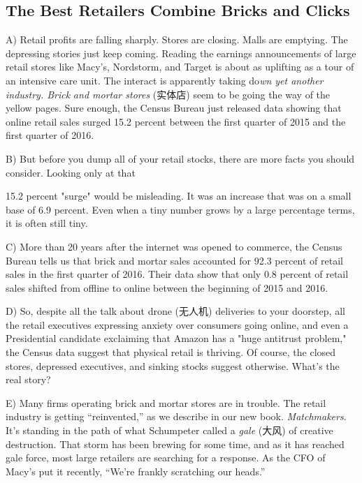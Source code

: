 \documentclass[UTF8,11pt]{ctexart}
\begin{document}
\subsection*{\textbf{The Best Retailers Combine Bricks and Clicks}}


A) Retail profits are falling sharply. Stores are closing. Malls are emptying. The depressing stories just keep coming. Reading the earnings announcements of large retail stores like Macy’s, Nordstorm, and Target is about as uplifting as a tour of an intensive care unit. The interact is apparently taking do\textit{wn yet another industry. Brick} \textit{and mortar stores} (实体店) seem to be going the way of the yellow pages. Sure enough, the Census Bureau just released data showing that online retail sales surged 15.2 percent between the first quarter of 2015 and the first quarter of 2016.


B) But before you dump all of your retail stocks, there are more facts you should consider. Looking only at that


15.2 percent "surge" would be misleading. It was an increase that was on a small base of 6.9 percent. Even when a tiny number grows by a large percentage terms, it is often still tiny.


C) More than 20 years after the internet was opened to commerce, the Census Bureau tells us that brick and mortar sales accounted for 92.3 percent of retail sales in the first quarter of 2016. Their data show that only 0.8 percent of retail sales shifted from offline to online between the beginning of 2015 and 2016.


D) So, despite all the talk about drone (无人机) deliveries to your doorstep, all the retail executives expressing anxiety over consumers going online, and even a Presidential candidate exclaiming that Amazon has a "huge antitrust problem," the Census data suggest that physical retail is thriving. Of course, the closed stores, depressed executives, and sinking stocks suggest otherwise. What's the real story?


E) Many firms operating brick and mortar stores are in trouble. The retail industry is getting “reinvented,” as we describe in our new book.\textit{ Matchmakers}. It’s standing in the path of what Schumpeter called a\textit{ gale} (大风) of creative destruction. That storm has been brewing for some time, and as it has reached gale force, most large retailers are searching for a response. As the CFO of Macy’s put it recently, “We’re frankly scratching our heads.”
\end{document}
